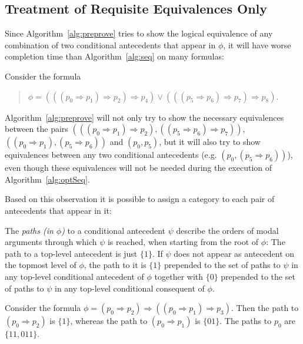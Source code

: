 \documentclass{entcs} \usepackage{entcsmacro}
\begin{document}
\subsection{Treatment of Requisite Equivalences Only}

Since Algorithm~\ref{alg:preprove} tries to show the logical equivalence of any combination
of two conditional antecedents that appear in $\phi$, it will have worse completion
time than Algorithm~\ref{alg:seq} on many formulas:

\begin{example}
Consider the formula 
\begin{quote}
$\phi=(((p_0\Rightarrow p_1)\Rightarrow p_2)\Rightarrow p_4)\vee
(((p_5\Rightarrow p_6)\Rightarrow p_7)\Rightarrow p_8)$.
\end{quote}
Algorithm~\ref{alg:preprove} will not only
try to show the necessary equivalences between the pairs
$(((p_0\Rightarrow p_1)\Rightarrow p_2), ((p_5\Rightarrow p_6)\Rightarrow p_7))$,
$((p_0\Rightarrow p_1), (p_5\Rightarrow p_6))$ and $(p_0,p_5)$, but it will
also try to show equivalences between any two conditional antecedents (e.g. $(p_0,
(p_5\Rightarrow p_6))$), even though these equivalences will not be needed
during the execution of Algorithm~\ref{alg:optSeq}.
\end{example}

Based on this observation it is possible to assign a category to each pair of
antecedents that appear in it:

\begin{definition}
The \emph{paths (in $\phi$)} to a conditional antecedent $\psi$ describe the orders
of modal arguments through which $\psi$ is reached, when starting from the root
of $\phi$:
The path to a top-level antecedent is just $\{1\}$. If $\psi$ does not appear as
antecedent on the topmost level of $\phi$, the path to it is $\{1\}$ prepended to the set
of paths to $\psi$ in any top-level conditional antecedent of $\phi$ together with $\{0\}$
prepended to the set of paths to $\psi$ in any top-level conditional consequent of $\phi$.
\end{definition}

\begin{example}
Consider the formula $\phi=(p_0\Rightarrow p_2)\Rightarrow ((p_0\Rightarrow p_1)\Rightarrow p_3)$. Then the path to
$(p_0\Rightarrow p_2)$ is $\{1\}$, whereas the path to $(p_0\Rightarrow p_1)$ is $\{01\}$. The paths
to $p_0$ are $\{11,011\}$.
\end{example}
\end{document}
